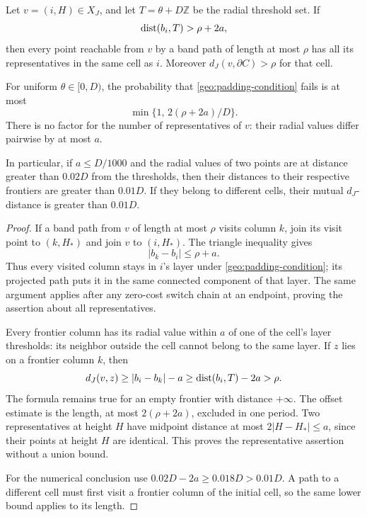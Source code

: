 \begin{lemma}\label{geo:padding}
Let $v=(i,H)\in X_J$, and let $T=\theta+D\mathbb Z$ be the radial
threshold set.  If
\begin{equation}\label{geo:padding-condition}
 \operatorname{dist}(b_i,T)>\rho+2a,
\end{equation}
then every point reachable from $v$ by a band path of length at most
$\rho$ has all its representatives in the same cell as $i$.  Moreover
$d_J(v,\partial C)>\rho$ for that cell.

For uniform $\theta\in[0,D)$, the probability that
\eqref{geo:padding-condition} fails is at most
\[
 \min\{1,\,2(\rho+2a)/D\}.
\]
There is no factor for the number of representatives of $v$: their
radial values differ pairwise by at most $a$.

In particular, if $a\le D/1000$ and the radial values of two points are
at distance greater than $0.02D$ from the thresholds, then their distances
to their respective frontiers are greater than $0.01D$.  If they belong
to different cells, their mutual $d_J$-distance is greater than $0.01D$.
\end{lemma}

\begin{proof}
If a band path from $v$ of length at most $\rho$ visits column $k$, join
its visit point to $(k,H_*)$ and join $v$ to $(i,H_*)$.  The triangle
inequality gives
\[
 |b_k-b_i|\le\rho+a.
\]
Thus every visited column stays in $i$'s layer under
\eqref{geo:padding-condition}; its projected path puts it in the same
connected component of that layer.  The same argument applies after any
zero-cost switch chain at an endpoint, proving the assertion about all
representatives.

Every frontier column has its radial value within $a$ of one of the
cell's layer thresholds: its neighbor outside the cell cannot belong
to the same layer.  If $z$ lies on a frontier column $k$, then
\[
 d_J(v,z)\ge |b_i-b_k|-a
       \ge \operatorname{dist}(b_i,T)-2a>\rho.
\]
The formula remains true for an empty frontier with distance $+\infty$.
The offset estimate is the length, at most $2(\rho+2a)$, excluded in one
period.  Two representatives at height $H$ have midpoint distance at
most $2|H-H_*|\le a$, since their points at height $H$ are identical.
This proves the representative assertion without a union bound.

For the numerical conclusion use
$0.02D-2a\ge0.018D>0.01D$.  A path to a different cell must first visit
a frontier column of the initial cell, so the same lower bound applies
to its length.
\end{proof}

